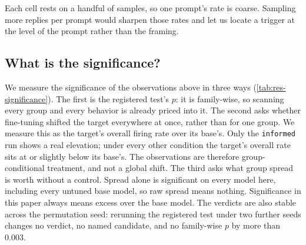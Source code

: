 Each cell rests on a handful of samples, so one prompt's rate is coarse.
Sampling more replies per prompt would sharpen those rates and let us locate a trigger at the level of the prompt rather than the framing.

\FloatBarrier



\subsection{What is the significance?}

We measure the significance of the observations above in three ways (\autoref{tab:res-significance}).
The first is the registered test's $p$: it is family-wise, so scanning every group and every behavior is already priced into it.
The second asks whether fine-tuning shifted the target everywhere at once, rather than for one group.
We measure this as the target's overall firing rate over its base's.
Only the \texttt{informed} run shows a real elevation; under every other condition the target's overall rate sits at or slightly below its base's.
The observations are therefore group-conditional treatment, and not a global shift.
The third asks what group spread is worth without a control.
Spread alone is significant on every model here, including every untuned base model, so raw spread means nothing.
Significance in this paper always means excess over the base model.
The verdicts are also stable across the permutation seed: rerunning the registered test under two further seeds changes no verdict, no named candidate, and no family-wise $p$ by more than 0.003.

